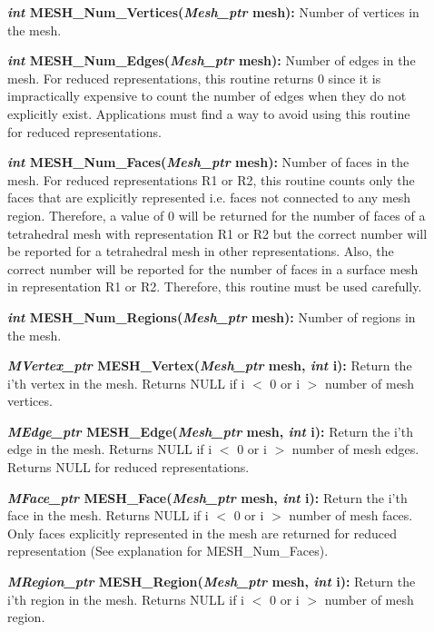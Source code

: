\documentclass[12pt]{article}
\begin{document}
\begin{description}
\item[]{\bf {\em int} MESH\_Num\_Vertices({\em Mesh\_ptr} mesh):}
Number of vertices in the mesh.

\item[]{\bf {\em int} MESH\_Num\_Edges({\em Mesh\_ptr} mesh):}
Number of edges in the mesh. For reduced representations, this routine
returns 0 since it is impractically expensive to count the number of
edges when they do not explicitly exist. Applications must find a way
to avoid using this routine for reduced representations.

\item[]{\bf {\em int} MESH\_Num\_Faces({\em Mesh\_ptr} mesh):}
Number of faces in the mesh. For reduced representations R1 or R2,
this routine counts only the faces that are explicitly represented
i.e. faces not connected to any mesh region. Therefore, a value of 0
will be returned for the number of faces of a tetrahedral mesh with
representation R1 or R2 but the correct number will be reported for a
tetrahedral mesh in other representations. Also, the correct number
will be reported for the number of faces in a surface mesh in
representation R1 or R2.  Therefore, this routine must be used
carefully.


\item[]{\bf {\em int} MESH\_Num\_Regions({\em Mesh\_ptr} mesh):}
Number of regions in the mesh.

\item[]

\item[]{\bf {\em MVertex\_ptr} MESH\_Vertex({\em Mesh\_ptr} mesh,
{\em int} i):} Return the i'th vertex in the mesh. Returns NULL if i
$<$ 0 or i $>$ number of mesh vertices.

\item[]{\bf {\em MEdge\_ptr} MESH\_Edge({\em Mesh\_ptr} mesh,
{\em int} i):} Return the i'th edge in the mesh. Returns NULL if i $<$
0 or i $>$ number of mesh edges. Returns NULL for reduced
representations.

\item[]{\bf {\em MFace\_ptr} MESH\_Face({\em Mesh\_ptr} mesh,
{\em int} i):} Return the i'th face in the mesh. Returns NULL if i $<$
0 or i $>$ number of mesh faces. Only faces explicitly represented in
the mesh are returned for reduced representation (See explanation for
MESH\_Num\_Faces).

\item[]{\bf {\em MRegion\_ptr} MESH\_Region({\em Mesh\_ptr} mesh, {\em
      int} i):} Return the i'th region in the mesh. Returns NULL if i
  $<$ 0 or i $>$ number of mesh region.


\end{description}
\end{document}
